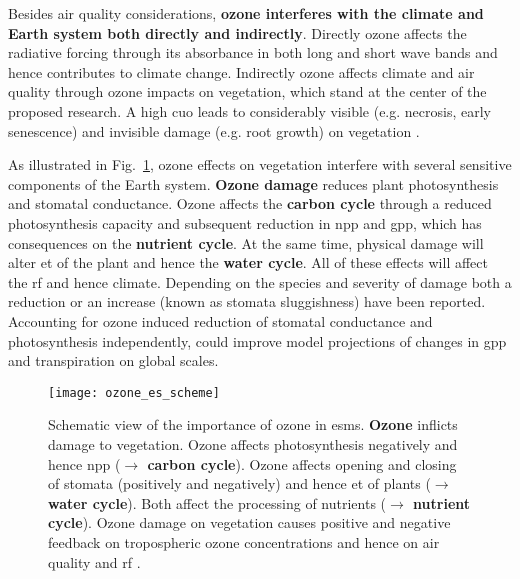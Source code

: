 Besides air quality considerations, \textbf{ozone interferes with the climate and Earth system both directly and indirectly}. Directly ozone affects the radiative forcing through its absorbance in both long and short wave bands and hence contributes to climate change. Indirectly ozone affects climate and air quality through ozone impacts on vegetation, which stand at the center of the proposed research. A high \gls{cuo} leads to considerably visible (e.g. necrosis, early senescence) and invisible damage (e.g. root growth) on vegetation \parencite{GCB:Mills2011}.

As illustrated in Fig.~\ref{fig:ozone_esm_scheme}, ozone effects on vegetation interfere with several sensitive components of the Earth system. \textbf{\color{red}Ozone damage} reduces plant photosynthesis and stomatal conductance. Ozone affects the \textbf{\color{darkgray}carbon cycle} through a reduced photosynthesis capacity and subsequent reduction in \gls{npp} and \gls{gpp}, which has consequences on the \textbf{\color{darkgray}nutrient cycle}. At the same time, physical damage will alter \gls{et} of the plant and hence the \textbf{\color{blue}water cycle}. All of these effects will affect the \gls{rf} and hence climate. Depending on the species and severity of damage both a reduction \parencite{Oe:Lombardozzi2012} or an increase (known as stomata sluggishness) \parencite{SR:Hoshika2015} have been reported. Accounting for ozone induced reduction of stomatal conductance and photosynthesis independently, \textcite{BGS:Lombardozzi2012} could improve model projections of changes in \gls{gpp} and transpiration on global scales.

\begin{figure}[!h]
  \centering
  \texttt{[image: ozone\_es\_scheme]}
  \caption{Schematic view of the importance of ozone in \glspl{esm}. \textbf{\color{red}Ozone} inflicts damage to vegetation. Ozone affects photosynthesis negatively and hence \gls{npp} (\textbf{\color{darkgray}$\rightarrow$ carbon cycle}). Ozone affects opening and closing of stomata (positively and negatively) and hence \gls{et} of plants (\textbf{\color{blue}$\rightarrow$ water cycle}). Both affect the processing of nutrients (\textbf{\color{darkgray}$\rightarrow$ nutrient cycle}). Ozone damage on vegetation causes positive and negative feedback on tropospheric ozone concentrations and hence on air quality and \gls{rf} \parencite{Nat:Sitch2007}.}
  \label{fig:ozone_esm_scheme}
\end{figure}


